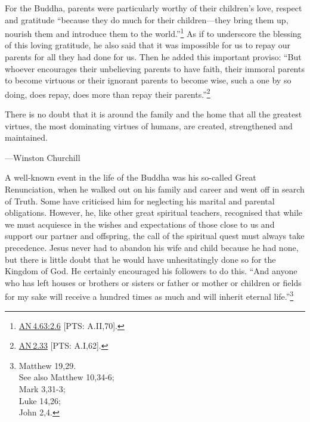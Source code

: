 \documentclass[10pt, openright]{book}
\newenvironment{epigram-2}%
{%
\setstretch{1.4}
\vspace{1em}
\noindent
\quoting[leftmargin=2cm,rightmargin=2cm]%
\begin{itshape}
\large
}%
{\end{itshape}\endquoting
}%
\newenvironment{epigram-2-cite}%
{%
\quoting[leftmargin=2cm,rightmargin=2cm]%
\noindent\normal\hspace*{\fill} 
}%
{\endquoting
}%
\begin{document}
For the Buddha, parents were particularly worthy of their children’s love, respect and gratitude “because they do much for their children—they bring them up, nourish them and introduce them to the world.”\footnote {\href{https://suttacentral.net/an4.63/en/sujato\#2.6}{AN 4.63:2.6} [PTS: A.II,70].} As if to underscore the blessing of this loving gratitude, he also said that it was impossible for us to repay our parents for all they had done for us. Then he added this important proviso: “But whoever encourages their unbelieving parents to have faith, their immoral parents to become virtuous or their ignorant parents to become wise, such a one by so doing, does repay, does more than repay their parents.”\footnote {\href{https://suttacentral.net/an2.33/en/sujato}{AN 2.33} [PTS: A.I,62].}


\begin{epigram-2}
There is no doubt that it is around the family and the home that all the greatest virtues, the most dominating virtues of humans, are created, strengthened and maintained.
\end{epigram-2}
\begin{epigram-2-cite}
—Winston Churchill
\end{epigram-2-cite}

A well-known event in the life of the Buddha was his so-called Great Renunciation, when he walked out on his family and career and went off in search of Truth. Some have criticised him for neglecting his marital and parental obligations. However, he, like other great spiritual teachers, recognised that while we must acquiesce in the wishes and expectations of those close to us and support our partner and offspring, the call of the spiritual quest must always take precedence. Jesus never had to abandon his wife and child because he had none, but there is little doubt that he would have unhesitatingly done so for the Kingdom of God. He certainly encouraged his followers to do this. “And anyone who has left houses or brothers or sisters or father or mother or children or fields for my sake will receive a hundred times as much and will inherit eternal life.”\footnote {Matthew 19,29.\\
See also Matthew 10,34-6;\\
Mark 3,31-3;\\
Luke 14,26;\\
John 2,4.}
\end{document}
